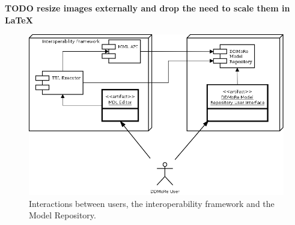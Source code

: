 \textbf{TODO resize images externally and drop the need to scale them in \LaTeX}

\begin{figure}[h!]
\centering
\includegraphics[width=0.75\linewidth]{img/UserInteraction}
\caption{Interactions between users, the interoperability framework and the Model Repository.}
\label{fig:userInteraction}
\end{figure}


